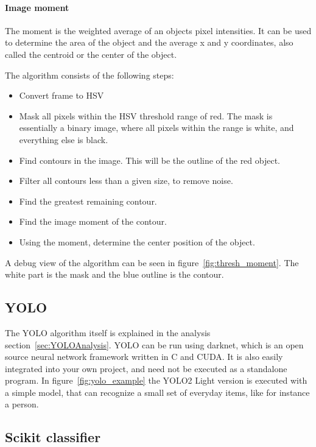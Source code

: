 \paragraph{Image moment}
The moment is the weighted average of an objects pixel intensities.
It can be used to determine the area of the object and the average x and y coordinates, also called the centroid or the center of the object.


The algorithm consists of the following steps:
\begin{itemize}
	\item Convert frame to HSV
	\item Mask all pixels within the HSV threshold range of red.
	The mask is essentially a binary image, where all pixels within the range is white, and everything else is black.
	\item Find contours in the image. 
	This will be the outline of the red object.
	\item Filter all contours less than a given size, to remove noise.
	\item Find the greatest remaining contour.
	\item Find the image moment of the contour.
	\item Using the moment, determine the center position of the object.
\end{itemize}

A debug view of the algorithm can be seen in figure~\ref{fig:thresh_moment}.
The white part is the mask and the blue outline is the contour.


\subsection{YOLO}

The YOLO algorithm itself is explained in the analysis section~\ref{sec:YOLOAnalysis}.
YOLO can be run using darknet, which is an open source neural network framework written in C and CUDA\cite{darknet13}.
It is also easily integrated into your own project, and need not be executed as a standalone program.
In figure~\ref{fig:yolo_example} the YOLO2 Light version is executed with a simple model, that can recognize a small set of everyday items, like for instance a person.


\subsection{Scikit classifier}
